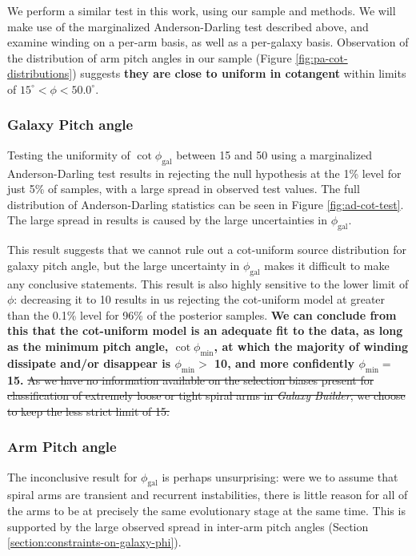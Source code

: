 We perform a similar test in this work, using our sample and methods. We will make use of the marginalized Anderson-Darling test described above, and examine winding on a per-arm basis, as well as a per-galaxy basis. Observation of the distribution of arm pitch angles in our sample (Figure \ref{fig:pa-cot-distributions}) suggests {\bf they are close to uniform in cotangent} within limits of $15^\circ < \phi < 50.0^\circ$.

\subsubsection{Galaxy Pitch angle}

Testing the uniformity of $\cot\phi_\mathrm{gal}$ between {15\degree} and {50\degree} using a marginalized Anderson-Darling test results in rejecting the null hypothesis at the 1\% level for just 5\% of samples, with a large spread in observed test values. The full distribution of Anderson-Darling statistics can be seen in Figure \ref{fig:ad-cot-test}. The large spread in results is caused by the large uncertainties in $\phi_\mathrm{gal}$.

This result suggests that we cannot rule out a cot-uniform source distribution for galaxy pitch angle, but the large uncertainty in $\phi_\mathrm{gal}$ makes it difficult to make any conclusive statements. This result is also highly sensitive to the lower limit of $\phi$: decreasing it to {10\degree} results in us rejecting the cot-uniform model at greater than the 0.1\% level for 96\% of the posterior samples. {\bf We can conclude from this that the \citet{2019arXiv190910291P} cot-uniform model is an adequate fit to the data, as long as the minimum pitch angle, $\cot{\phi_\mathrm{min}}$, at which the majority of winding dissipate and/or disappear is  $\phi_\mathrm{min} > $ {10\degree}, and more confidently $\phi_\mathrm{min} = $ {15\degree}.} \sout{As we have no information available on the selection biases present for classification of extremely loose or tight spiral arms in \textit{Galaxy Builder}, we choose to keep the less strict limit of {15\degree}.}

\subsubsection{Arm Pitch angle}
The inconclusive result for $\phi_\mathrm{gal}$ is perhaps unsurprising: were we to assume that spiral arms are transient and recurrent instabilities, there is little reason for all of the arms to be at precisely the same evolutionary stage at the same time. This is supported by the large observed spread in inter-arm pitch angles (Section \ref{section:constraints-on-galaxy-phi}).

